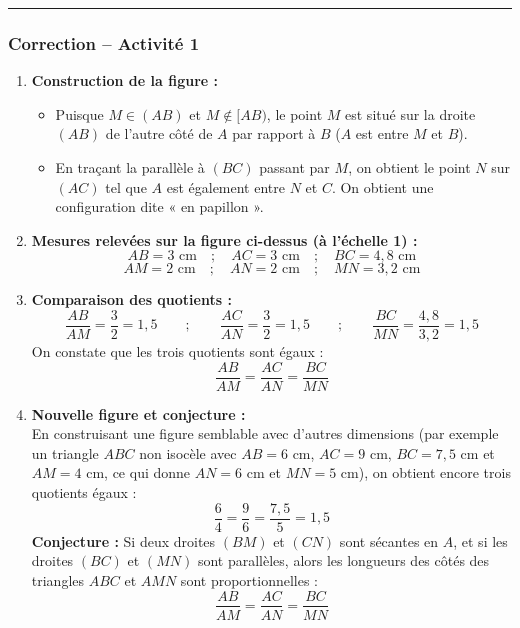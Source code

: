 \documentclass[12pt,a4paper]{article}
\begin{document}
\vspace{0.5cm}
\hrule
\vspace{0.5cm}

\subsubsection*{\color{myred} Correction -- Activité 1}

\begin{enumerate}
    \item \textbf{Construction de la figure :}
    \begin{itemize}
        \item[\textbullet] Puisque $M \in (AB)$ et $M \notin [AB)$, le point $M$ est situé sur la droite $(AB)$ de l'autre côté de $A$ par rapport à $B$ ($A$ est entre $M$ et $B$).
        \item[\textbullet] En traçant la parallèle à $(BC)$ passant par $M$, on obtient le point $N$ sur $(AC)$ tel que $A$ est également entre $N$ et $C$. On obtient une configuration dite « en papillon ».
    \end{itemize}

    \item \textbf{Mesures relevées sur la figure ci-dessus (à l'échelle 1) :}
    \[
        AB = 3\text{ cm} \quad ; \quad AC = 3\text{ cm} \quad ; \quad BC = 4,8\text{ cm}
    \]
    \[
        AM = 2\text{ cm} \quad ; \quad AN = 2\text{ cm} \quad ; \quad MN = 3,2\text{ cm}
    \]

    \item \textbf{Comparaison des quotients :}
    \[
        \dfrac{AB}{AM} = \dfrac{3}{2} = 1,5 \qquad ; \qquad \dfrac{AC}{AN} = \dfrac{3}{2} = 1,5 \qquad ; \qquad \dfrac{BC}{MN} = \dfrac{4,8}{3,2} = 1,5
    \]
    On constate que les trois quotients sont égaux :
    \[
        \dfrac{AB}{AM} = \dfrac{AC}{AN} = \dfrac{BC}{MN}
    \]

    \item \textbf{Nouvelle figure et conjecture :}\\
    En construisant une figure semblable avec d'autres dimensions (par exemple un triangle $ABC$ non isocèle avec $AB = 6\text{ cm}$, $AC = 9\text{ cm}$, $BC = 7,5\text{ cm}$ et $AM = 4\text{ cm}$, ce qui donne $AN = 6\text{ cm}$ et $MN = 5\text{ cm}$), on obtient encore trois quotients égaux :
    \[
        \dfrac{6}{4} = \dfrac{9}{6} = \dfrac{7,5}{5} = 1,5
    \]
    \textbf{Conjecture :} Si deux droites $(BM)$ et $(CN)$ sont sécantes en $A$, et si les droites $(BC)$ et $(MN)$ sont parallèles, alors les longueurs des côtés des triangles $ABC$ et $AMN$ sont proportionnelles :
    \[
        \dfrac{AB}{AM} = \dfrac{AC}{AN} = \dfrac{BC}{MN}
    \]
\end{enumerate}
\end{document}
